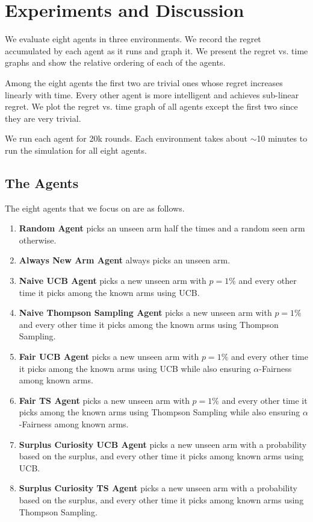 \section{Experiments and Discussion}

We evaluate eight agents in three environments. We record the regret accumulated by each agent as it runs and graph it. We present the regret vs. time graphs and show the relative ordering of each of the agents.

Among the eight agents the first two are trivial ones whose regret increases linearly with time. Every other agent is more intelligent and achieves sub-linear regret. We plot the regret vs. time graph of all agents except the first two since they are very trivial.

We run each agent for 20k rounds. Each environment takes about $\sim$10 minutes to run the simulation for all eight agents.

\subsection{The Agents}

The eight agents that we focus on are as follows.

\begin{enumerate}
    \item \textbf{Random Agent} picks an unseen arm half the times and a random seen arm otherwise.
    \item \textbf{Always New Arm Agent} always picks an unseen arm.
    \item \textbf{Naive UCB Agent} picks a new unseen arm with $p=1\%$ and every other time it picks among the known arms using UCB.
    \item \textbf{Naive Thompson Sampling Agent} picks a new unseen arm with $p=1\%$ and every other time it picks among the known arms using Thompson Sampling.
    \item \textbf{Fair UCB Agent} picks a new unseen arm with $p=1\%$ and every other time it picks among the known arms using UCB while also ensuring $\alpha$-Fairness among known arms.
    \item \textbf{Fair TS Agent} picks a new unseen arm with $p=1\%$ and every other time it picks among the known arms using Thompson Sampling while also ensuring $\alpha$-Fairness among known arms.
    \item \textbf{Surplus Curiosity UCB Agent} picks a new unseen arm with a probability based on the surplus, and every other time it picks among known arms using UCB.
    \item \textbf{Surplus Curiosity TS Agent} picks a new unseen arm with a probability based on the surplus, and every other time it picks among known arms using Thompson Sampling.
\end{enumerate}

